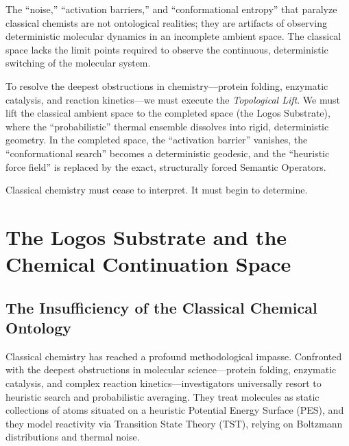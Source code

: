 \documentclass[11pt,openany]{extbook}
\theoremstyle{plain}
\theoremstyle{definition}
\begin{document}
The ``noise,'' ``activation barriers,'' and ``conformational entropy'' that paralyze classical chemists are not ontological realities; they are artifacts of observing deterministic molecular dynamics in an incomplete ambient space. The classical space lacks the limit points required to observe the continuous, deterministic switching of the molecular system.

To resolve the deepest obstructions in chemistry---protein folding, enzymatic catalysis, and reaction kinetics---we must execute the \emph{Topological Lift}. We must lift the classical ambient space to the completed space (the Logos Substrate), where the ``probabilistic'' thermal ensemble dissolves into rigid, deterministic geometry. In the completed space, the ``activation barrier'' vanishes, the ``conformational search'' becomes a deterministic geodesic, and the ``heuristic force field'' is replaced by the exact, structurally forced Semantic Operators.

Classical chemistry must cease to interpret. It must begin to determine.




\chapter{The Logos Substrate and the Chemical Continuation Space}

\section{The Insufficiency of the Classical Chemical Ontology}

Classical chemistry has reached a profound methodological impasse. Confronted with the deepest obstructions in molecular science---protein folding, enzymatic catalysis, and complex reaction kinetics---investigators universally resort to heuristic search and probabilistic averaging. They treat molecules as static collections of atoms situated on a heuristic Potential Energy Surface (PES), and they model reactivity via Transition State Theory (TST), relying on Boltzmann distributions and thermal noise.
\end{document}
